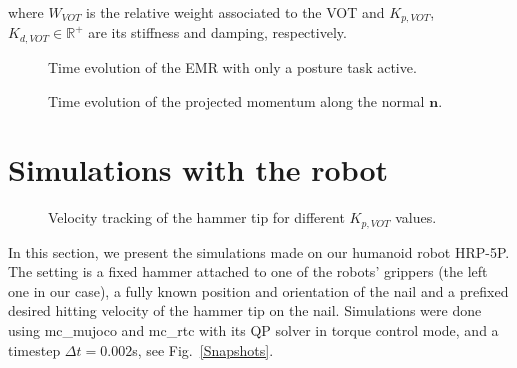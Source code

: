 \documentclass[conference]{IEEEtran}
\begin{document}
where $W_{VOT}$ is the relative weight associated to the VOT and $K_{p, VOT}$, $K_{d, VOT} \in \mathbb{R}^+$ are its stiffness and damping, respectively. 
\begin{figure}
    \centering
    
    \caption{Time evolution of the EMR with only a posture task active.}
    \label{Time evolution of the effective mass of the robot 1}
\end{figure}
\begin{figure}
    \centering
    
    \caption{Time evolution of the projected momentum along the normal $\mathbf{n}$.}
    \label{Time evolution of the momentum projected along the normal n}
\end{figure}
\section{Simulations with the robot}
\label{Simulations}
\begin{figure}
    \centering
    
    \caption{Velocity tracking of the hammer tip for different $K_{p, VOT}$ values.}
    \label{Velocity tracking of the hammer tip}
\end{figure}
%     
%     
\noindent
In this section, we present the simulations made on our humanoid robot HRP-5P. The setting is a fixed hammer attached to one of the robots' grippers (the left one in our case), a fully known position and orientation of the nail and a prefixed desired hitting velocity of the hammer tip on the nail.  
Simulations were done using mc\_mujoco and mc\_rtc \cite{singhMcmujocoSimulatingArticulated2022} with its QP solver in torque control mode, and a timestep $\Delta t = 0.002$s, see Fig.~\ref{Snapshots}. 
\end{document}
